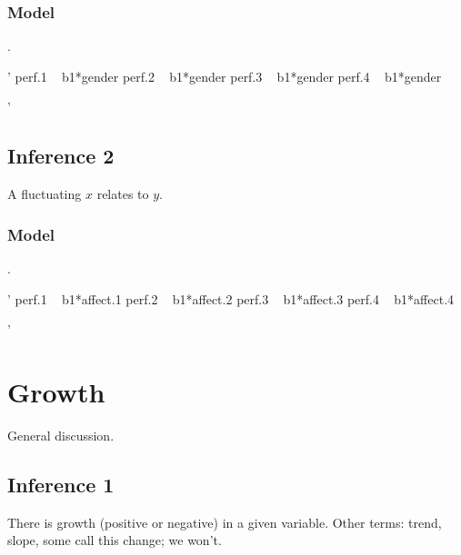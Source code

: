 \documentclass[english,,man]{apa6}
\newenvironment{Shaded}{\begin{snugshade}}{\end{snugshade}}
\newcommand{\StringTok}[1]{\textcolor[rgb]{0.31,0.60,0.02}{#1}}
\theoremstyle{definition}
\theoremstyle{definition}
\theoremstyle{definition}
\theoremstyle{remark}
\begin{document}
\hypertarget{model}{%
\subsubsection{Model}\label{model}}

.

\begin{Shaded}
\begin{Highlighting}[]
\StringTok{'}
\StringTok{perf.1 ~ b1*gender}
\StringTok{perf.2 ~ b1*gender}
\StringTok{perf.3 ~ b1*gender}
\StringTok{perf.4 ~ b1*gender}

\StringTok{'}
\end{Highlighting}
\end{Shaded}

\hypertarget{inference-2}{%
\subsection{Inference 2}\label{inference-2}}

A fluctuating \(x\) relates to \(y\).

\hypertarget{model-1}{%
\subsubsection{Model}\label{model-1}}

.

\begin{Shaded}
\begin{Highlighting}[]
\StringTok{'}
\StringTok{perf.1 ~ b1*affect.1}
\StringTok{perf.2 ~ b1*affect.2}
\StringTok{perf.3 ~ b1*affect.3}
\StringTok{perf.4 ~ b1*affect.4}

\StringTok{'}
\end{Highlighting}
\end{Shaded}

\hypertarget{growth}{%
\section{Growth}\label{growth}}

General discussion.

\hypertarget{inference-1-1}{%
\subsection{Inference 1}\label{inference-1-1}}

There is growth (positive or negative) in a given variable. Other terms:
trend, slope, some call this change; we won't.
\end{document}
